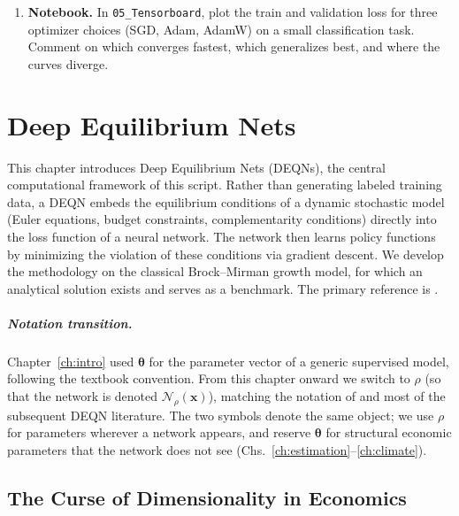 \documentclass[11pt,a4paper]{report}
\newcommand{\x}{\bm{x}}
\begin{document}
\begin{enumerate}[itemsep=4pt, leftmargin=*]
\item\label{ex:ch1:7} \textbf{Notebook.}  In \texttt{05\_Tensorboard}, plot the train and validation loss for three optimizer choices (SGD, Adam, AdamW) on a small classification task.  Comment on which converges fastest, which generalizes best, and where the curves diverge.
\end{enumerate}


\chapter{Deep Equilibrium Nets}
\label{ch:deqn}

This chapter introduces Deep Equilibrium Nets (DEQNs), the central computational framework of this script.  Rather than generating labeled training data, a DEQN embeds the equilibrium conditions of a dynamic stochastic model (Euler equations, budget constraints, complementarity conditions) directly into the loss function of a neural network.  The network then learns policy functions by minimizing the violation of these conditions via gradient descent.  We develop the methodology on the classical Brock--Mirman growth model, for which an analytical solution exists and serves as a benchmark.  The primary reference is \citet{azinovicDEEPEQUILIBRIUMNETS2022}.

\paragraph{Notation transition.}  Chapter~\ref{ch:intro} used $\bm{\theta}$ for the parameter vector of a generic supervised model, following the textbook convention.  From this chapter onward we switch to $\rho$ (so that the network is denoted $\mathcal{N}_\rho(\x)$), matching the notation of \citet{azinovicDEEPEQUILIBRIUMNETS2022} and most of the subsequent DEQN literature.  The two symbols denote the same object; we use $\rho$ for parameters wherever a network appears, and reserve $\bm{\theta}$ for structural economic parameters that the network does not see (Chs.~\ref{ch:estimation}--\ref{ch:climate}).

\section{The Curse of Dimensionality in Economics}
\label{sec:curse_of_dim}
\end{document}
